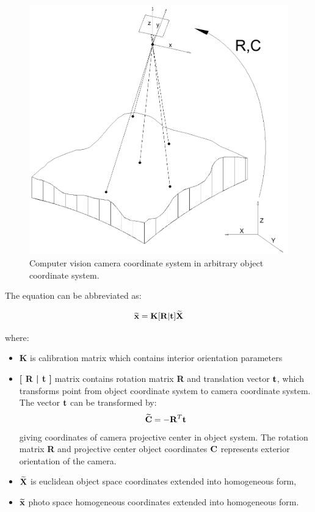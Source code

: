 \documentclass[a4paper,12pt]{article}
\newcommand{\ematr}[1]{
{\bf #1}
}
\newcommand{\evect}[1]{
{\bf #1}
}
\newcommand{\ehvect}[1]{
{\bf \widetilde{#1}}
}
\begin{document}
\begin{figure}[h]
    \centering
    \includegraphics[scale=0.3]{figures/photogrammetric_model.png}
    \caption{Computer vision camera coordinate system in arbitrary object coordinate system.}
    \label{fig:cv_model}
\end{figure}

The equation can be abbreviated as:

\begin{equation}
\label{eq:p_exp}
\ehvect{x} = \ematr{K} \ematr{[}\ematr{R}|\evect{t}\ematr{]} \ehvect{X}
\end{equation}

where:

\begin{itemize}
\item \ematr{K} is calibration matrix which contains interior orientation parameters
\item \ematr{[\ematr{R}|\evect{t}]} matrix contains rotation matrix\ematr{R} and translation vector $\evect{t}$, 
	      which transforms point from object coordinate system 
	      to camera coordinate system. 
	      The vector $\evect{t}$ can  be transformed by:
	      \begin{equation}
	      \ehvect{C} = - \ematr{R}^{T}\evect{t}
	      \end{equation}
	      giving coordinates of camera projective center in object system. 
	      The rotation matrix \ematr{R} and projective 
	      center object coordinates $\evect{C}$
	      represents exterior orientation of the camera.   
\item $\ehvect{X}$ is euclidean object space coordinates extended into homogeneous form,
\item $\ehvect{x}$ photo space homogeneous coordinates extended into homogeneous form.
\end{itemize}
\end{document}
